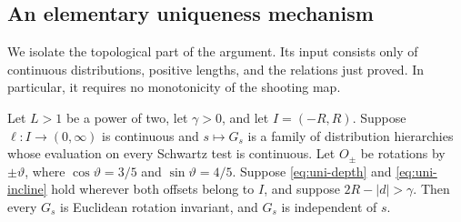 \subsection{An elementary uniqueness mechanism}

We isolate the topological part of the argument.  Its input consists only
of continuous distributions, positive lengths, and the relations just
proved.  In particular, it requires no monotonicity of the shooting map.

\begin{lemma}\label{lem:dense-periods}
Let $L>1$ be a power of two, let $\gamma>0$, and let
$I=(-R,R)$.  Suppose $\ell:I\to(0,\infty)$ is continuous and
$s\mapsto G_s$ is a family of distribution hierarchies whose evaluation
on every Schwartz test is continuous.  Let $O_\pm$ be rotations by
$\pm\vartheta$, where $\cos\vartheta=3/5$ and
$\sin\vartheta=4/5$.  Suppose \eqref{eq:uni-depth} and
\eqref{eq:uni-incline} hold wherever both offsets belong to $I$, and
suppose $2R-|d|>\gamma$.
Then every $G_s$ is Euclidean rotation invariant, and $G_s$ is independent
of $s$.
\end{lemma}

